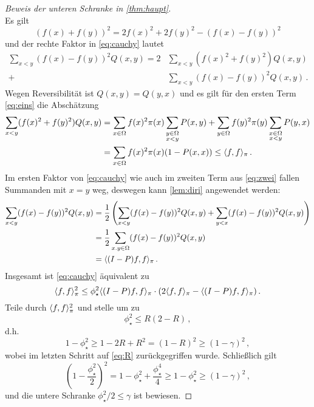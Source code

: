 \documentclass[ngerman,a4paper,11pt]{scrartcl}
\DeclarePairedDelimiter{\sprod}{\langle}{\rangle}	%
\begin{document}
\begin{proof}[Beweis der unteren Schranke in \cref{thm:haupt}]
\begin{equation}
 \end{equation}
 Es gilt
 \begin{equation*}
  (f(x)+f(y))^2=2f(x)^2+2f(y)^2-(f(x)-f(y))^2 
 \end{equation*}
 und der rechte Faktor in \cref{eq:cauchy} lautet
 \begin{align}
  \sum_{x<y}(f(x)-f(y))^2Q(x,y)=2&\sum_{x<y}(f(x)^2+f(y)^2)Q(x,y) \label{eq:eins} \\
  +&\sum_{x<y}(f(x)-f(y))^2Q(x,y)\, . \label{eq:zwei}
 \end{align}
 Wegen Reversibilität ist $Q(x,y)=Q(y,x)$ und es gilt für den ersten Term
 \eqref{eq:eins} die Abschätzung
 \begin{align*}
  \sum_{x<y}(f(x)^2+f(y)^2)Q(x,y)&=\sum_{x\in\Omega}f(x)^2\pi(x)\sum_{\substack{y\in\Omega\\x<y}}P(x,y)+\sum_{y\in\Omega}f(y)^2\pi(y)\sum_{\substack{x\in\Omega\\x<y}}P(y,x) \\
  &=\sum_{x\in\Omega}f(x)^2\pi(x)(1-P(x,x))\leq\sprod{f,f}_\pi \, .
 \end{align*}
 Im ersten Faktor von \cref{eq:cauchy} wie auch im zweiten Term aus
 \cref{eq:zwei} fallen Summanden mit $x=y$ weg, deswegen kann \cref{lem:diri}
 angewendet werden:
 \begin{align*}
  \sum_{x<y}(f(x)-f(y))^2Q(x,y)&=\frac{1}{2}\left( \sum_{x<y}(f(x)-f(y))^2Q(x,y)+\sum_{y<x}(f(x)-f(y))^2Q(x,y)\right)\\
  &=\frac{1}{2}\sum_{x.y\in\Omega}(f(x)-f(y))^2Q(x,y) \\
  &=\sprod{(I-P)f,f}_\pi\, .
 \end{align*}
 Insgesamt ist \cref{eq:cauchy} äquivalent zu
 \begin{equation*}
  \sprod{f,f}_\pi^2\leq\phi_\star^2\sprod{(I-P)f,f}_\pi\cdot (2\sprod{f,f}_\pi-\sprod{(I-P)f,f}_\pi) \, .
 \end{equation*}
 Teile durch $\sprod{f,f}_\pi^2$ und stelle um zu
 \begin{equation*}
  \phi_\star^2\leq R(2-R)\, ,
 \end{equation*}
 d.h.
 \begin{equation*}
  1-\phi_\star^2\geq1-2R+R^2=(1-R)^2\geq(1-\gamma)^2\, , 
 \end{equation*}
 wobei im letzten Schritt auf \cref{eq:R} zurückgegriffen wurde. Schließlich gilt
 \begin{equation*}
  \left( 1-\frac{\phi_\star^2}{2} \right)^2=1-\phi_\star^2+\frac{\phi_\star^4}{4}\geq 1-\phi_\star^2\geq (1-\gamma)^2\, , 
 \end{equation*}
 und die untere Schranke $\phi_\star^2/2\leq\gamma$ ist bewiesen.
\end{proof}
\printbibliography
\end{document}
